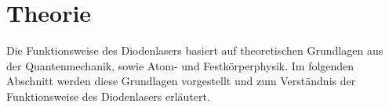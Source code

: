 \section{Theorie}
\label{sec:Theorie}
    Die Funktionsweise des Diodenlasers basiert auf theoretischen Grundlagen aus der Quantenmechanik, sowie Atom- und Festkörperphysik.
    Im folgenden Abschnitt werden diese Grundlagen vorgestellt und zum Verständnis der Funktionsweise des Diodenlasers erläutert.
    



